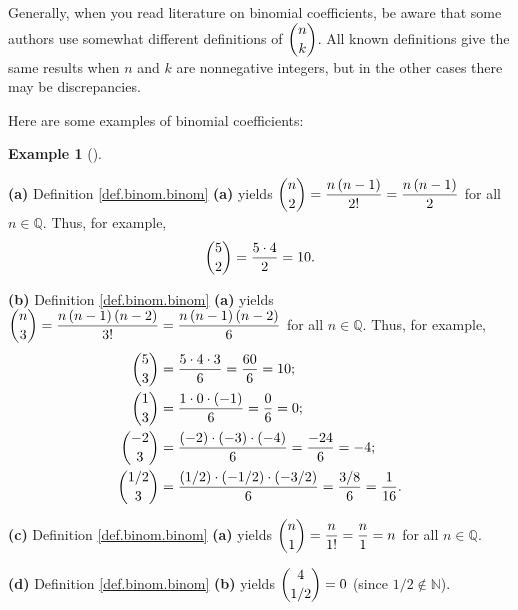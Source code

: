 \documentclass[numbers=enddot,12pt,final,onecolumn,notitlepage]{scrartcl}%
\numberwithin{exer}{subsection}
\theoremstyle{definition}
\newtheorem{exam}[theo]{Example}
\newenvironment{example}[1][]
{\begin{exam}[#1]\begin{leftbar}}
{\end{leftbar}\end{exam}}
\begin{document}
Generally, when you read literature on binomial coefficients, be aware that
some authors use somewhat different definitions of $\dbinom{n}{k}$. All known
definitions give the same results when $n$ and $k$ are nonnegative integers,
but in the other cases there may be discrepancies.

Here are some examples of binomial coefficients:

\begin{example}
\textbf{(a)} Definition \ref{def.binom.binom} \textbf{(a)} yields $\dbinom
{n}{2}=\dfrac{n\left(  n-1\right)  }{2!}=\dfrac{n\left(  n-1\right)  }{2}$ for
all $n\in\mathbb{Q}$. Thus, for example,%
\[
\dbinom{5}{2}=\dfrac{5\cdot4}{2}=10.
\]


\textbf{(b)} Definition \ref{def.binom.binom} \textbf{(a)} yields $\dbinom
{n}{3}=\dfrac{n\left(  n-1\right)  \left(  n-2\right)  }{3!}=\dfrac{n\left(
n-1\right)  \left(  n-2\right)  }{6}$ for all $n\in\mathbb{Q}$. Thus, for
example,%
\begin{align*}
\dbinom{5}{3}  &  =\dfrac{5\cdot4\cdot3}{6}=\dfrac{60}{6}=10;\\
\dbinom{1}{3}  &  =\dfrac{1\cdot0\cdot\left(  -1\right)  }{6}=\dfrac{0}%
{6}=0;\\
\dbinom{-2}{3}  &  =\dfrac{\left(  -2\right)  \cdot\left(  -3\right)
\cdot\left(  -4\right)  }{6}=\dfrac{-24}{6}=-4;\\
\dbinom{1/2}{3}  &  =\dfrac{\left(  1/2\right)  \cdot\left(  -1/2\right)
\cdot\left(  -3/2\right)  }{6}=\dfrac{3/8}{6}=\dfrac{1}{16}.
\end{align*}


\textbf{(c)} Definition \ref{def.binom.binom} \textbf{(a)} yields $\dbinom
{n}{1}=\dfrac{n}{1!}=\dfrac{n}{1}=n$ for all $n\in\mathbb{Q}$.

\textbf{(d)} Definition \ref{def.binom.binom} \textbf{(b)} yields $\dbinom
{4}{1/2}=0$ (since $1/2\notin\mathbb{N}$).
\end{example}
\end{document}
